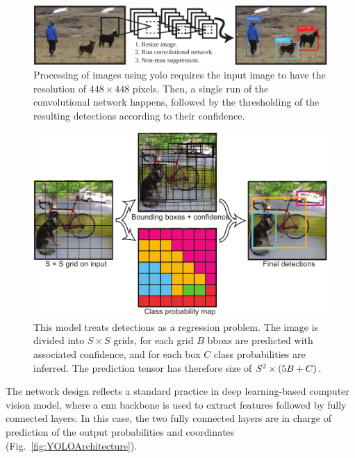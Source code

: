 \begin{figure}[t]
    \centerline{\includegraphics[width=0.8\linewidth]{figures/theoretical_foundations/yolo_general_idea.pdf}}
    \caption[\Gls{yolo} processing pipeline]{Processing of images using \gls{yolo} requires the input image to have the resolution of $448 \times 448$ pixels. Then, a single run of the convolutional network happens, followed by the thresholding of the resulting detections according to their confidence. }
    \label{fig:YOLOGeneralIdea}
\end{figure}

\begin{figure}[t]
    \centerline{\includegraphics[width=0.8\linewidth]{figures/theoretical_foundations/yolo_bboxes_progression.pdf}}
    \caption[\Gls{yolo} detections]{This model treats detections as a regression problem. The image is divided into $S \times S$ grids, for each grid $B$ \glspl{bbox} are predicted with associated confidence, and for each box $C$ class probabilities are inferred. The prediction tensor has therefore size of $S^2 \times \left( {5B + C} \right)$. }
    \label{fig:YOLOBBOXESProgression}
\end{figure}

The network design reflects a standard practice in deep learning-based computer vision model, where a \gls{cnn} backbone is used to extract features followed by fully connected layers. In this case, the two fully connected layers are in charge of prediction of the output probabilities and coordinates (Fig.~\ref{fig:YOLOArchitecture}).

